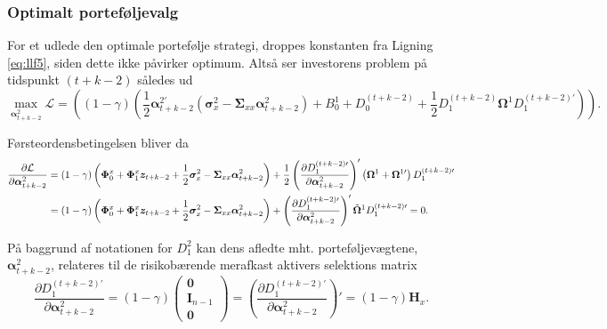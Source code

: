 \documentclass[
  a4paper,
  oneside]{memoir}
\begin{document}
\hypertarget{optimportaer}{%
\subsubsection{Optimalt porteføljevalg}\label{optimportaer}}

For et udlede den optimale portefølje strategi, droppes konstanten fra Ligning \eqref{eq:llf5}, siden dette ikke påvirker optimum. Altså ser investorens problem på tidspunkt \((t+k-2)\) således ud
\[\max_{\bm{\alpha}_{t+k-2}^2}\mathcal{L}= \left( \left(1-\gamma\right) \left(\frac{1}{2}\bm{\alpha}_{t+k-2}^{2\prime} \left(\bm{\sigma}_x^2 - \bm{\Sigma}_{xx}\bm{\alpha}_{t+k-2}^2\right) + B_0^1 + D_0^{\left(t+k-2\right)} + \frac{1}{2} D_1^{\left(t+k-2\right)} \bm{\Omega}^1 D_1^{\left(t+k-2\right)\prime}\right)\right).\]

Førsteordensbetingelsen bliver da
\begin{align*}
\frac{\partial \mathcal{L}}{\partial\bm{\alpha}_{t+k-2}^2 }&=\left(1-\gamma\right) \left(\bm{\Phi}_0^x+\bm{\Phi}_1^x\bm{z}_{t+k-2} + \frac{1}{2} \bm{\sigma}_x^2 -\bm{\Sigma}_{xx}\bm{\alpha}_{t+k-2}^2 \right) + \frac{1}{2} \left(\frac{\partial D_1^{\left(t+k-2\right)\prime}}{\partial \bm{\alpha}_{t+k-2}^2}\right)' \left(\bm{\Omega}^1+\bm{\Omega}^{1\prime}\right) D_1^{\left(t+k-2\right)\prime}\\
                                                           &=\left(1-\gamma\right) \left(\bm{\Phi}_0^x+\bm{\Phi}_1^x\bm{z}_{t+k-2} + \frac{1}{2} \bm{\sigma}_x^2 -\bm{\Sigma}_{xx}\bm{\alpha}_{t+k-2}^2 \right) + \left(\frac{\partial D_1^{\left(t+k-2\right)\prime}}{\partial \bm{\alpha}_{t+k-2}^2}\right)' \Tilde{\bm{\Omega}}^1 D_1^{\left(t+k-2\right)\prime} = 0.
\end{align*}

På baggrund af notationen for \(D_1^2\) kan dens afledte mht. porteføljevægtene, \(\bm{\alpha}_{t+k-2}^2\), relateres til de risikobærende merafkast aktivers selektions matrix
\[\frac{\partial D_1^{\left(t+k-2\right)\prime}}{\partial \bm{\alpha}_{t+k-2}^2} = \left(1-\gamma\right) \begin{pmatrix} \bm{0} \\ \bm{I}_{n-1} \\ \bm{0}\end{pmatrix}=\left(\frac{\partial D_1^{\left(t+k-2\right)\prime}}{\partial \bm{\alpha}_{t+k-2}^2}\right)' = \left(1-\gamma\right)\bm{H}_x.\]
\end{document}
